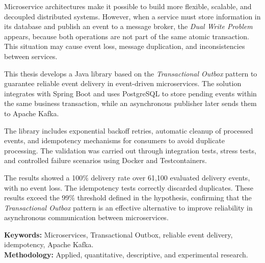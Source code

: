 Microservice architectures make it possible to build more flexible, scalable, and decoupled distributed systems. However, when a service must store information in its database and publish an event to a message broker, the \textit{Dual Write Problem} appears, because both operations are not part of the same atomic transaction. This situation may cause event loss, message duplication, and inconsistencies between services.

This thesis develops a Java library based on the \textit{Transactional Outbox} pattern to guarantee reliable event delivery in event-driven microservices. The solution integrates with Spring Boot and uses PostgreSQL to store pending events within the same business transaction, while an asynchronous publisher later sends them to Apache Kafka.

The library includes exponential backoff retries, automatic cleanup of processed events, and idempotency mechanisms for consumers to avoid duplicate processing. The validation was carried out through integration tests, stress tests, and controlled failure scenarios using Docker and Testcontainers.

The results showed a 100\% delivery rate over 61,100 evaluated delivery events, with no event loss. The idempotency tests correctly discarded duplicates. These results exceed the 99\% threshold defined in the hypothesis, confirming that the \textit{Transactional Outbox} pattern is an effective alternative to improve reliability in asynchronous communication between microservices.

\textbf{Keywords:} Microservices, Transactional Outbox, reliable event delivery, idempotency, Apache Kafka.\\
\textbf{Methodology:} Applied, quantitative, descriptive, and experimental research.
